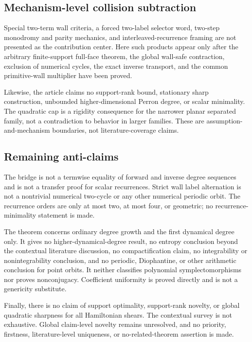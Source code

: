 \documentclass[11pt]{article}
\theoremstyle{definition}
\theoremstyle{remark}
\begin{document}
\subsection{Mechanism-level collision subtraction}

Special two-term wall criteria, a forced two-label selector word,
two-step monodromy and parity mechanics, and interleaved-recurrence
framing are not presented as the contribution center.  Here such products
appear only after the arbitrary finite-support full-face theorem, the
global wall-safe contraction, exclusion of numerical cycles, the exact
inverse transport, and the common primitive-wall multiplier have been
proved.

Likewise, the article claims no support-rank bound, stationary sharp
construction, unbounded higher-dimensional Perron degree, or scalar
minimality.  The quadratic cap is a rigidity consequence for the narrower
planar separated family, not a contradiction to behavior in larger
families.  These are assumption-and-mechanism boundaries, not
literature-coverage claims.

\subsection{Remaining anti-claims}

The bridge is not a termwise equality of forward and inverse degree
sequences and is not a transfer proof for scalar recurrences.  Strict wall
label alternation is not a nontrivial numerical two-cycle or any other
numerical periodic orbit.  The recurrence orders are only at most two,
at most four, or geometric; no recurrence-minimality statement is made.

The theorem concerns ordinary degree growth and the first dynamical
degree only.  It gives no higher-dynamical-degree result, no entropy
conclusion beyond the contextual literature discussion, no
compactification claim, no integrability or nonintegrability conclusion,
and no periodic, Diophantine, or other arithmetic conclusion for point
orbits.  It neither classifies polynomial symplectomorphisms nor proves
nonconjugacy.  Coefficient uniformity is proved directly and is not a
genericity substitute.

Finally, there is no claim of support optimality, support-rank novelty, or
global quadratic sharpness for all Hamiltonian shears.  The contextual
survey is not exhaustive.  Global claim-level novelty remains unresolved,
and no priority, firstness, literature-level uniqueness, or
no-related-theorem assertion is made.
\end{document}
